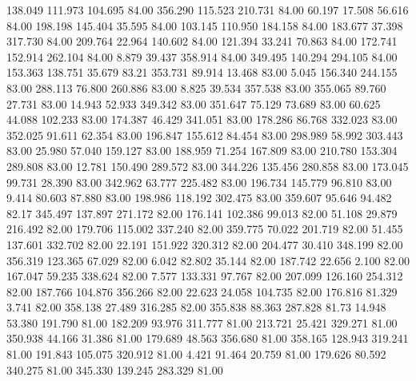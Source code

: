  138.049  111.973  104.695        84.00
 356.290  115.523  210.731        84.00
  60.197   17.508   56.616        84.00
 198.198  145.404   35.595        84.00
 103.145  110.950  184.158        84.00
 183.677   37.398  317.730        84.00
 209.764   22.964  140.602        84.00
 121.394   33.241   70.863        84.00
 172.741  152.914  262.104        84.00
   8.879   39.437  358.914        84.00
 349.495  140.294  294.105        84.00
 153.363  138.751   35.679        83.21
 353.731   89.914   13.468        83.00
   5.045  156.340  244.155        83.00
 288.113   76.800  260.886        83.00
   8.825   39.534  357.538        83.00
 355.065   89.760   27.731        83.00
  14.943   52.933  349.342        83.00
 351.647   75.129   73.689        83.00
  60.625   44.088  102.233        83.00
 174.387   46.429  341.051        83.00
 178.286   86.768  332.023        83.00
 352.025   91.611   62.354        83.00
 196.847  155.612   84.454        83.00
 298.989   58.992  303.443        83.00
  25.980   57.040  159.127        83.00
 188.959   71.254  167.809        83.00
 210.780  153.304  289.808        83.00
  12.781  150.490  289.572        83.00
 344.226  135.456  280.858        83.00
 173.045   99.731   28.390        83.00
 342.962   63.777  225.482        83.00
 196.734  145.779   96.810        83.00
   9.414   80.603   87.880        83.00
 198.986  118.192  302.475        83.00
 359.607   95.646   94.482        82.17
 345.497  137.897  271.172        82.00
 176.141  102.386   99.013        82.00
  51.108   29.879  216.492        82.00
 179.706  115.002  337.240        82.00
 359.775   70.022  201.719        82.00
  51.455  137.601  332.702        82.00
  22.191  151.922  320.312        82.00
 204.477   30.410  348.199        82.00
 356.319  123.365   67.029        82.00
   6.042   82.802   35.144        82.00
 187.742   22.656    2.100        82.00
 167.047   59.235  338.624        82.00
   7.577  133.331   97.767        82.00
 207.099  126.160  254.312        82.00
 187.766  104.876  356.266        82.00
  22.623   24.058  104.735        82.00
 176.816   81.329    3.741        82.00
 358.138   27.489  316.285        82.00
 355.838   88.363  287.828        81.73
  14.948   53.380  191.790        81.00
 182.209   93.976  311.777        81.00
 213.721   25.421  329.271        81.00
 350.938   44.166   31.386        81.00
 179.689   48.563  356.680        81.00
 358.165  128.943  319.241        81.00
 191.843  105.075  320.912        81.00
   4.421   91.464   20.759        81.00
 179.626   80.592  340.275        81.00
 345.330  139.245  283.329        81.00
